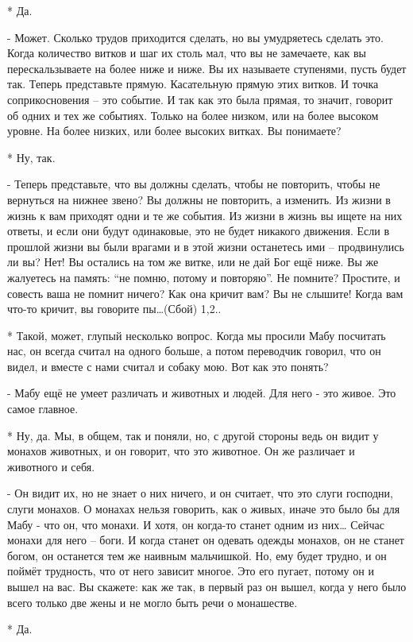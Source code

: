 * Да.

- Может. Сколько трудов приходится сделать, но вы умудряетесь сделать это. Когда количество витков и шаг их столь мал, что вы не замечаете, как вы перескальзываете на более ниже и ниже. Вы их называете ступенями, пусть будет так. Теперь представьте прямую. Касательную прямую этих витков. И точка соприкосновения – это событие. И так как это была прямая, то значит, говорит об одних и тех же событиях. Только на более низком, или на более высоком уровне. На более низких, или более высоких витках. Вы понимаете?

* Ну, так.

 - Теперь представьте, что вы должны сделать, чтобы не повторить, чтобы не вернуться на нижнее звено? Вы должны не повторить, а изменить. Из жизни в жизнь к вам приходят одни и те же события. Из жизни в жизнь вы ищете на них ответы, и если они будут одинаковые, это не будет никакого движения. Если в прошлой жизни вы были врагами и в этой жизни останетесь ими – продвинулись ли вы? Нет! Вы остались на том же витке, или не дай Бог ещё ниже. Вы же жалуетесь на память: “не помню, потому и повторяю”. Не помните? Простите, и совесть ваша не помнит ничего? Как она кричит вам?  Вы не слышите! Когда вам что-то кричит, вы говорите пы…(Сбой)
1,2..

* Такой, может, глупый несколько вопрос. Когда мы просили Мабу посчитать нас, он всегда считал на одного больше, а потом переводчик говорил, что он видел, и вместе с нами считал и собаку мою. Вот как это понять?

- Мабу ещё не умеет различать и животных и людей. Для него - это живое. Это самое главное.

* Ну, да. Мы, в общем, так и поняли, но, с другой стороны ведь он видит у монахов животных, и он говорит, что это животное. Он же различает и животного и себя.

- Он видит их, но не знает о них ничего, и он считает, что это слуги господни, слуги монахов. О монахах нельзя говорить, как о живых, иначе это было бы для Мабу -  что он, что монахи. И хотя, он когда-то станет одним из них… Сейчас  монахи для него – боги. И когда станет он одевать одежды монахов, он не станет богом, он останется тем же наивным мальчишкой. Но, ему будет трудно, и он поймёт трудность, что от него зависит многое. Это его пугает, потому он и вышел на вас. Вы скажете: как же так, в первый раз он вышел, когда у него было всего только две жены и не могло быть речи о монашестве.

* Да.

